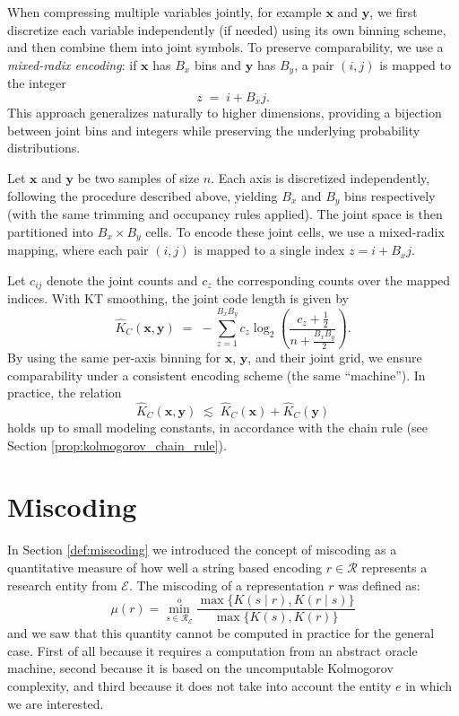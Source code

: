 When compressing multiple variables jointly, for example $\mathbf{x}$ and $\mathbf{y}$, we first discretize each variable independently (if needed) using its own binning scheme, and then combine them into joint symbols. To preserve comparability, we use a \emph{mixed-radix encoding}: if $\mathbf{x}$ has $B_x$ bins and $\mathbf{y}$ has $B_y$, a pair $(i,j)$ is mapped to the integer
\[
z \;=\; i + B_x j.  
\]
This approach generalizes naturally to higher dimensions, providing a bijection between joint bins and integers while preserving the underlying probability distributions.

\begin{example}
Let $\mathbf{x}$ and $\mathbf{y}$ be two samples of size $n$. Each axis is discretized independently, following the procedure described above, yielding $B_x$ and $B_y$ bins respectively (with the same trimming and occupancy rules applied). The joint space is then partitioned into $B_x \times B_y$ cells. To encode these joint cells, we use a mixed-radix mapping, where each pair $(i,j)$ is mapped to a single index $z = i + B_x j$.

Let $c_{ij}$ denote the joint counts and $c_z$ the corresponding counts over the mapped indices. With KT smoothing, the joint code length is given by
\[
\widehat{K}_C(\mathbf{x},\mathbf{y})  
\;=\;  
-\sum_{z=1}^{B_x B_y} c_z \log_2\!\left(\frac{c_z+\tfrac12}{n+\tfrac{B_x B_y}{2}}\right).  
\]
By using the same per-axis binning for $\mathbf{x}$, $\mathbf{y}$, and their joint grid, we ensure comparability under a consistent encoding scheme (the same “machine”). In practice, the relation
\[
\widehat{K}_C(\mathbf{x},\mathbf{y}) \;\lesssim\; \widehat{K}_C(\mathbf{x}) + \widehat{K}_C(\mathbf{y})  
\]
holds up to small modeling constants, in accordance with the chain rule (see Section \ref{prop:kolmogorov_chain_rule}).
\end{example}

%
%

\section{Miscoding}
\label{sec:machine_learning_miscoding}

In Section \ref{def:miscoding} we introduced the concept of miscoding as a quantitative measure of how well a string based encoding $r \in \mathcal{R}$ represents a research entity from $\mathcal{E}$. The miscoding of a representation $r$ was defined as:
\[
\mu(r) = \overset{o}{ \underset{s \in \mathcal{R}_\mathcal{E}} \min} \frac{ \max\{ K(s \mid r), K(r \mid s) \} } { \max\{ K(s), K(r) \} }
\]
and we saw that this quantity cannot be computed in practice for the general case. First of all because it requires a computation from an abstract oracle machine, second because it is based on the uncomputable Kolmogorov complexity, and third because it does not take into account the entity $e$ in which we are interested. 

